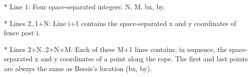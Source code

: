 * Line 1: Four space-separated integers: N, M, bx, by.

* Lines 2..1+N: Line i+1 contains the space-separated x and y         coordinates of fence post i.

* Lines 2+N..2+N+M: Each of these M+1 lines contains, in sequence, the         space-separated x and y coordinates of a point along the rope.         The first and last points are always the same as Bessie's         location (bx, by).